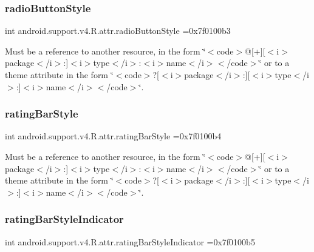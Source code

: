 \subsubsection{\texorpdfstring{radio\+Button\+Style}{radioButtonStyle}}
{\footnotesize\ttfamily int android.\+support.\+v4.\+R.\+attr.\+radio\+Button\+Style =0x7f0100b3\hspace{0.3cm}{\ttfamily [static]}}

Must be a reference to another resource, in the form \char`\"{}$<$code$>$@\mbox{[}+\mbox{]}\mbox{[}$<$i$>$package$<$/i$>$\+:\mbox{]}$<$i$>$type$<$/i$>$\+:$<$i$>$name$<$/i$>$$<$/code$>$\char`\"{} or to a theme attribute in the form \char`\"{}$<$code$>$?\mbox{[}$<$i$>$package$<$/i$>$\+:\mbox{]}\mbox{[}$<$i$>$type$<$/i$>$\+:\mbox{]}$<$i$>$name$<$/i$>$$<$/code$>$\char`\"{}. \mbox{\label{classandroid_1_1support_1_1v4_1_1R_1_1attr_aba190d638db09f1bd63f84b321dcd510}} 
\subsubsection{\texorpdfstring{rating\+Bar\+Style}{ratingBarStyle}}
{\footnotesize\ttfamily int android.\+support.\+v4.\+R.\+attr.\+rating\+Bar\+Style =0x7f0100b4\hspace{0.3cm}{\ttfamily [static]}}

Must be a reference to another resource, in the form \char`\"{}$<$code$>$@\mbox{[}+\mbox{]}\mbox{[}$<$i$>$package$<$/i$>$\+:\mbox{]}$<$i$>$type$<$/i$>$\+:$<$i$>$name$<$/i$>$$<$/code$>$\char`\"{} or to a theme attribute in the form \char`\"{}$<$code$>$?\mbox{[}$<$i$>$package$<$/i$>$\+:\mbox{]}\mbox{[}$<$i$>$type$<$/i$>$\+:\mbox{]}$<$i$>$name$<$/i$>$$<$/code$>$\char`\"{}. \mbox{\label{classandroid_1_1support_1_1v4_1_1R_1_1attr_a0c3270465c677567d768450904e74941}} 
\subsubsection{\texorpdfstring{rating\+Bar\+Style\+Indicator}{ratingBarStyleIndicator}}
{\footnotesize\ttfamily int android.\+support.\+v4.\+R.\+attr.\+rating\+Bar\+Style\+Indicator =0x7f0100b5\hspace{0.3cm}{\ttfamily [static]}}

